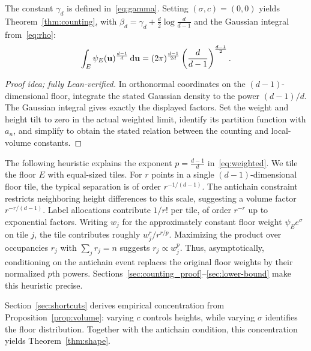 \documentclass[11pt,letterpaper]{article}
\begin{document}
\begin{remark}\label{rem:proof-thm-1}
      The constant $\gamma_d$ is defined in~\eqref{eq:gamma}. Setting $(\sigma,c)=(0,0)$ yields Theorem~\ref{thm:counting}, with $\beta_d=\gamma_d+\frac d2\log\frac d{d-1}$ and the Gaussian integral from~\eqref{eq:rho}:
      \[
            \int_E\psi_E(\mathbf u)^{\frac{d-1}{d}}\,\mathrm d\mathbf u
            =(2\pi)^{\frac{d-1}{2d}}
            \left(\frac d{d-1}\right)^{\frac{d-1}{2}}.
      \]
\end{remark}

\begin{proof}[Proof idea; fully Lean-verified]
In orthonormal coordinates on the $(d-1)$-dimensional floor, integrate the stated Gaussian density to the power $(d-1)/d$. The Gaussian integral gives exactly the displayed factors. Set the weight and height tilt to zero in the actual weighted limit, identify its partition function with $a_n$, and simplify to obtain the stated relation between the counting and local-volume constants.
\end{proof}

\begin{remark}
      The following heuristic explains the exponent $p=\frac{d-1}{d}$ in~\eqref{eq:weighted}. We tile the floor $E$ with equal-sized tiles. For $r$ points in a single $(d-1)$-dimensional floor tile, the typical separation is of order $r^{-1/(d-1)}$. The antichain constraint restricts neighboring height differences to this scale, suggesting a volume factor $r^{-r/(d-1)}$. Label allocations contribute $1/r!$ per tile, of order $r^{-r}$ up to exponential factors. Writing $w_j$ for the approximately constant floor weight $\psi_E e^\sigma$ on tile $j$, the tile contributes roughly $w_j^r/r^{r/p}$. Maximizing the product over occupancies $r_j$ with $\sum_jr_j=n$ suggests $r_j\propto w_j^p$. Thus, asymptotically, conditioning on the antichain event replaces the original floor weights by their normalized $p$th powers. Sections~\ref{sec:counting_proof}--\ref{sec:lower-bound} make this heuristic precise.
\end{remark}

Section~\ref{sec:shortcuts} derives empirical concentration from Proposition~\ref{prop:volume}: varying $c$ controls heights, while varying $\sigma$ identifies the floor distribution. Together with the antichain condition, this concentration yields Theorem~\ref{thm:shape}.
\end{document}
